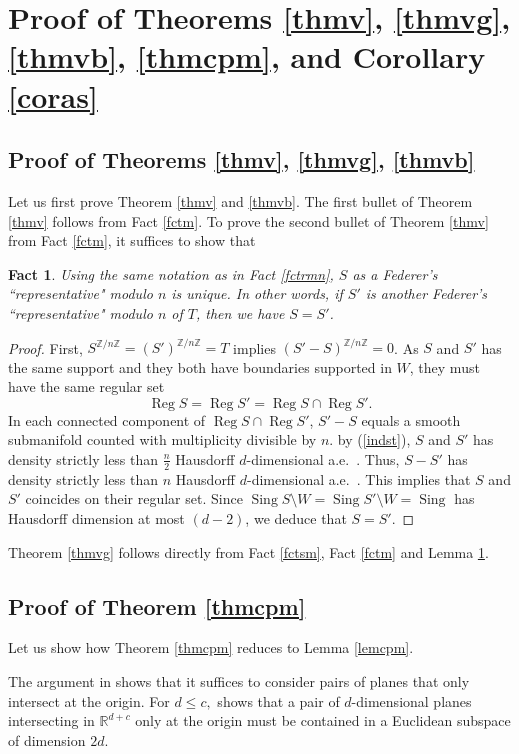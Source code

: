\documentclass[11pt,a4paper]{amsart}
\numberwithin{equation}{section}
\newcommand{\reg}{\operatorname{Reg}}
\newcommand{\sing}{\operatorname{Sing}}
\newcommand{\R}{\mathbb{R}}
\newcommand{\Z}{\mathbb{Z}}
\theoremstyle{plain}
\newtheorem{fact}{Fact}[subsection]
\theoremstyle{definition}
\numberwithin{equation}{subsection}
\begin{document}
\section{Proof of Theorems \ref{thmv}, \ref{thmvg}, \ref{thmvb}, \ref{thmcpm}, and Corollary \ref{coras}}\label{secpm}
	\subsection{Proof of Theorems \ref{thmv}, \ref{thmvg}, \ref{thmvb}}
Let us first prove Theorem \ref{thmv} and \ref{thmvb}.	The first bullet of Theorem \ref{thmv} follows from Fact \ref{fctm}. To prove the second bullet of Theorem \ref{thmv} from Fact \ref{fctm}, it suffices to show that
\begin{fact}\label{lemssp}
	Using the same notation as in Fact \ref{fctrmn},  $S$ as a Federer's ``representative" modulo $n$ is unique. In other words, if $S'$ is another Federer's ``representative" modulo $n$ of $T$, then we have	$S=S'$.
\end{fact}
	\begin{proof}		
First,  $S^{\Z/n\Z}=(S')^{\Z/n\Z}=T$ implies $(S'-S)^{\Z/n\Z}=0$.  As $S$ and $S'$ has the same support and they both have boundaries supported in $W$, they must have the same regular set $$\reg S=\reg S'=\reg S\cap \reg S'.$$ In each connected component of $\reg S\cap \reg S'$, $S'-S$ equals a smooth submanifold counted with multiplicity divisible by $n.$  by (\ref{indst}), $S$ and $S'$ has density strictly less than $\frac{n}{2}$ Hausdorff $d$-dimensional a.e.~. Thus, $S-S'$ has density strictly less than $n$ Hausdorff $d$-dimensional a.e.~. 	This implies that $S$ and $S'$ coincides on their regular set. Since $\sing S\setminus W=\sing S'\setminus W=\sing $ has Hausdorff dimension at most $(d-2)$, we deduce that $S=S'.$\end{proof}
Theorem \ref{thmvg} follows directly from Fact \ref{fctsm}, Fact \ref{fctm} and Lemma \ref{lemssp}. 
	\subsection{Proof of Theorem \ref{thmcpm}}Let us show how Theorem  \ref{thmcpm} reduces to Lemma \ref{lemcpm}. 
	
	The argument in	\cite[Section 5]{GLac} shows that it suffices to consider pairs of planes that only intersect at the origin. For $d\le c,$ \cite[Lemma 7.5]{HL} shows that a pair of $d$-dimensional planes intersecting in $\R^{d+c}$ only at the origin must be contained in a Euclidean subspace of dimension $2d$.
	
\end{document}
